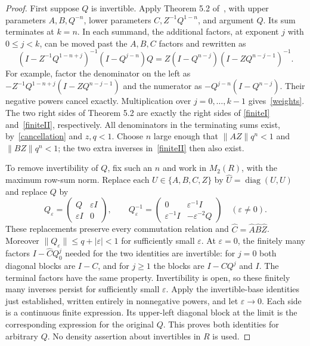 \documentclass[11pt]{article}
\newcommand{\norm}[1]{\lVert#1\rVert}
\begin{document}
\begin{proof}
First suppose $Q$ is invertible. Apply Theorem 5.2 of~\cite{S}, with
upper parameters $A,B,Q^{-n}$, lower parameters $C,Z^{-1}Q^{1-n}$,
and argument $Q$. Its sum terminates at $k=n$. In each summand, the
additional factors, at exponent $j$ with $0\leq j<k$, can be moved
past the $A,B,C$ factors and rewritten as
\begin{equation}\label{cancellation}
 (I-Z^{-1}Q^{1-n+j})^{-1}(I-Q^{j-n})Q
 =Z(I-Q^{n-j})(I-ZQ^{n-j-1})^{-1}.
\end{equation}
For example, factor the denominator on the left as
$-Z^{-1}Q^{1-n+j}(I-ZQ^{n-j-1})$ and the numerator as
$-Q^{j-n}(I-Q^{n-j})$. Their negative powers cancel exactly.
Multiplication over $j=0,\ldots,k-1$ gives~\eqref{weights}.
The two right sides of Theorem 5.2 are exactly the right sides of
\eqref{finiteI} and~\eqref{finiteII}, respectively. All denominators
in the terminating sums exist, by~\eqref{cancellation} and $z,q<1$.
Choose $n$ large enough that $\norm{AZ}q^n<1$ and $\norm{BZ}q^n<1$;
the two extra inverses in~\eqref{finiteII} then also exist.

To remove invertibility of $Q$, fix such an $n$ and work in $M_2(R)$,
with the maximum row-sum norm. Replace each $U\in\{A,B,C,Z\}$ by
$\widehat U=\operatorname{diag}(U,U)$ and replace $Q$ by
\[
 Q_\varepsilon=\begin{pmatrix}Q&\varepsilon I\\\varepsilon I&0\end{pmatrix},
 \qquad
 Q_\varepsilon^{-1}=\begin{pmatrix}0&\varepsilon^{-1}I\\
              \varepsilon^{-1}I&-\varepsilon^{-2}Q\end{pmatrix}
 \quad(\varepsilon\ne0).
\]
These replacements preserve every commutation relation and
$\widehat C=\widehat A\widehat B\widehat Z$.
Moreover $\norm{Q_\varepsilon}\leq q+|\varepsilon|<1$ for sufficiently
small $\varepsilon$. At $\varepsilon=0$, the finitely many factors
$I-\widehat C Q_0^j$ needed for the two identities are invertible:
for $j=0$ both diagonal blocks are $I-C$, and for $j\geq1$ the blocks
are $I-CQ^j$ and $I$. The terminal factors have the same property.
Invertibility is open, so these finitely many inverses persist for
sufficiently small $\varepsilon$. Apply the invertible-base identities
just established, written entirely in nonnegative powers, and let
$\varepsilon\to0$. Each side is a continuous finite expression.
Its upper-left diagonal block at the limit is the corresponding
expression for the original $Q$. This proves both identities for
arbitrary $Q$. No density assertion about invertibles in $R$ is used.
\end{proof}
\end{document}
